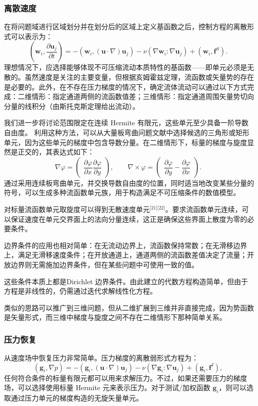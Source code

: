\subsubsection{离散速度}
在将问题域进行区域划分并在划分后的区域上定义基函数之后，控制方程的离散形式可以表示为：
$$
\left(\mathbf{w}_i, \frac{\partial \mathbf{u}_j}{\partial t}\right)
= 
-\left(\mathbf{w}_i, (\mathbf{u} \cdot \nabla)\mathbf{u}_j\right)
-\nu \left(\nabla \mathbf{w}_i : \nabla \mathbf{u}_j\right)
+\left(\mathbf{w}_i, \mathbf{f}^S\right).~
$$
理想情况下，应选择能够体现不可压缩流动本质特性的基函数——即单元必须是无散的。虽然速度是关注的主要变量，但根据亥姆霍兹定理，流函数或矢量势的存在是必要的。此外，在不存在压力梯度的情况下，确定流体流动可以通过以下方式完成：二维情形：指定通道两侧的流函数值差；三维情形：指定通道周围矢量势切向分量的线积分（由斯托克斯定理给出流动）。

我们进一步将讨论范围限定在连续 Hermite 有限元，这些单元至少具备一阶导数自由度。
利用这种方法，可以从大量板弯曲问题文献中选择候选的三角形或矩形单元，因为这些单元的梯度中包含导数分量。在二维情形下，标量的梯度与旋度显然是正交的，其表达式如下：
$$
\nabla \varphi =
\begin{pmatrix}
\dfrac{\partial \varphi}{\partial x} 
\dfrac{\partial \varphi}{\partial y}
\end{pmatrix},
\qquad
\nabla \times \varphi =
\begin{pmatrix}
\dfrac{\partial \varphi}{\partial y} 
-\dfrac{\partial \varphi}{\partial x}
\end{pmatrix}.~
$$
通过采用连续板弯曲单元，并交换导数自由度的位置，同时适当地改变某些分量的符号，可以生成多种流函数单元族，用于构造满足不可压缩条件的数值模型。

对标量流函数单元取旋度可以得到无散速度单元\(^\text{[21][22]}\)。要求流函数单元连续，可以保证速度在单元交界面上的法向分量连续，这正是确保这些界面上散度为零的必要条件。

边界条件的应用也相对简单：在无流动边界上，流函数保持常数；在无滑移边界上，满足无滑移速度条件；在开放通道上，通道两侧的流函数差值决定了流量；开放边界则无需施加边界条件，但在某些问题中可使用一致的值。

这些条件本质上都是Dirichlet 边界条件。由此建立的代数方程构造简单，但由于方程是非线性的，仍需通过迭代求解线性化方程。

类似的思路可以推广到三维问题，但从二维扩展到三维并非直接完成，因为势函数是矢量形式，而三维中梯度与旋度之间不存在二维情形下那种简单关系。
\subsubsection{压力恢复}
从速度场中恢复压力非常简单。压力梯度的离散弱形式方程为：
$$
(\mathbf{g}_i, \nabla p)
= -(\mathbf{g}_i, (\mathbf{u} \cdot \nabla)\mathbf{u}_j)
-\nu (\nabla \mathbf{g}_i : \nabla \mathbf{u}_j)
+(\mathbf{g}_i, \mathbf{f}^I),~
$$
任何符合条件的标量有限元都可以用来求解压力。不过，如果还需要压力的梯度场，可以选择使用标量 Hermite 元来表示压力。对于测试/加权函数 $\mathbf{g}_i$，则可以选取通过压力单元的梯度构造的无旋矢量单元。
